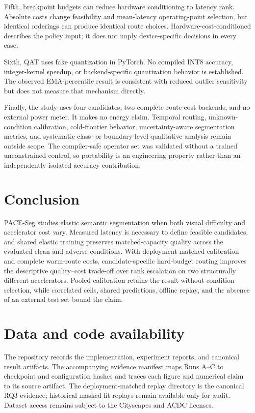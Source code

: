 \documentclass[a4paper,review,12pt]{elsarticle}
\newcommand{\method}{PACE-Seg}
\begin{document}
Fifth, breakpoint budgets can reduce hardware conditioning to latency rank. Absolute costs change feasibility and mean-latency operating-point selection, but identical orderings can produce identical route choices. Hardware-cost-conditioned describes the policy input; it does not imply device-specific decisions in every case.

Sixth, QAT uses fake quantization in PyTorch. No compiled INT8 accuracy, integer-kernel speedup, or backend-specific quantization behavior is established. The observed EMA-percentile result is consistent with reduced outlier sensitivity but does not measure that mechanism directly.

Finally, the study uses four candidates, two complete route-cost backends, and no external power meter. It makes no energy claim. Temporal routing, unknown-condition calibration, cold-frontier behavior, uncertainty-aware segmentation metrics, and systematic class- or boundary-level qualitative analysis remain outside scope. The compiler-safe operator set was validated without a trained unconstrained control, so portability is an engineering property rather than an independently isolated accuracy contribution.

\section{Conclusion}
\label{sec:conclusion}

\method{} studies elastic semantic segmentation when both visual difficulty and accelerator cost vary. Measured latency is necessary to define feasible candidates, and shared elastic training preserves matched-capacity quality across the evaluated clean and adverse conditions. With deployment-matched calibration and complete warm-route costs, candidate-specific hard-budget routing improves the descriptive quality--cost trade-off over rank escalation on two structurally different accelerators. Pooled calibration retains the result without condition selection, while correlated cells, shared predictions, offline replay, and the absence of an external test set bound the claim.

\section*{Data and code availability}

The repository records the implementation, experiment reports, and canonical result artifacts. The accompanying evidence manifest maps Runs A--C to checkpoint and configuration hashes and traces each figure and numerical claim to its source artifact. The deployment-matched replay directory is the canonical RQ3 evidence; historical masked-fit replays remain available only for audit. Dataset access remains subject to the Cityscapes and ACDC licenses.
\end{document}
